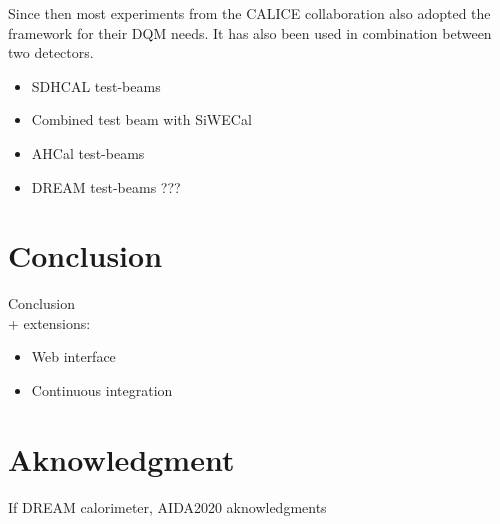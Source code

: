 \documentclass{webofc}
\begin{document}
Since then most experiments from the CALICE collaboration also adopted the framework for their DQM needs. It has also been used in combination between two detectors.

\begin{itemize}
  \item SDHCAL test-beams
  \item Combined test beam with SiWECal
  \item AHCal test-beams
  \item DREAM test-beams ???
\end{itemize}

\section{Conclusion}
\label{sec:conclusion}

Conclusion \\
+ extensions:

\begin{itemize}
  \item Web interface
  \item Continuous integration
\end{itemize}

\section{Aknowledgment}
\label{sec:aknowledgment}

If DREAM calorimeter, AIDA2020 aknowledgments
\end{document}
